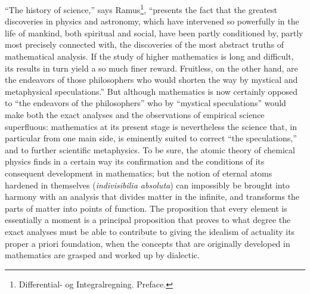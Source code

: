 \documentclass[12pt,a4paper,openany]{book}
\begin{document}
``The history of science,'' says Ramus\footnote[2]{Differential- og Integralregning. Preface.}, ``presents the fact that the greatest discoveries in physics and astronomy, which have intervened so powerfully in the life of mankind, both spiritual and social, have been partly conditioned by, partly most precisely connected with, the discoveries of the most abstract truths of mathematical analysis. If the study of higher mathematics is long and difficult, its results in turn yield a so much finer reward. Fruitless, on the other hand, are the endeavors of those philosophers who would shorten the way by mystical and metaphysical speculations.'' But although mathematics is now certainly opposed to ``the endeavors of the philosophers'' who by ``mystical speculations'' would make both the exact analyses and the observations of empirical science superfluous: mathematics at its present stage is nevertheless the science that, in particular from one main side, is eminently suited to correct ``the speculations,'' and to further scientific metaphysics. To be sure, the atomic theory of chemical physics finds in a certain way its confirmation and the conditions of its consequent development in mathematics; but the notion of eternal atoms hardened in themselves (\textit{indivisibilia
absoluta}) can impossibly be brought into harmony with an analysis that divides matter in the infinite, and transforms the parts of matter into points of function. The proposition that every element is essentially a moment is a principal proposition that proves to what degree the exact analyses must be able to contribute to giving the idealism of actuality its proper a priori foundation, when the concepts that are originally developed in mathematics are grasped and worked up by dialectic.
\end{document}
